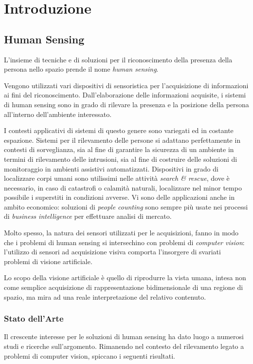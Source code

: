 
\chapter{Introduzione}
\label{chap:introduction}
    \section{Human Sensing}
    \label{sec:human_sensing}
        L'insieme di tecniche e di soluzioni per il riconoscimento della presenza della persona nello spazio prende il nome \emph{human sensing}.

        Vengono utilizzati vari dispositivi di sensoristica per l'acquisizione di informazioni ai fini del riconoscimento. 
        Dall'elaborazione delle informazioni acquisite, i sistemi di human sensing sono in grado di rilevare la presenza e la posizione della persona all'interno dell'ambiente interessato.

        I contesti applicativi di sistemi di questo genere sono variegati ed in costante espazione.
        Sistemi per il rilevamento delle persone si adattano perfettamente in contesti di sorveglianza, sia al fine di garantire la sicurezza di un ambiente in termini di rilevamento delle intrusioni, sia al fine di costruire delle soluzioni di monitoraggio in ambienti assistivi automatizzati.
        Dispositivi in grado di localizzare corpi umani sono utilissimi nelle attività \emph{search \& rescue}, dove è necessario, in caso di catastrofi o calamità naturali, localizzare nel minor tempo possibile i superstiti in condizioni avverse.
        Vi sono delle applicazioni anche in ambito economico: soluzioni di \emph{people counting} sono sempre più usate nei processi di \emph{business intelligence} per effettuare analisi di mercato.

        Molto spesso, la natura dei sensori utilizzati per le acquisizioni, fanno in modo che i problemi di human sensing si intersechino con problemi di \emph{computer vision}: l'utilizzo di sensori ad acquisizione visiva comporta l'insorgere di svariati problemi di visione artificiale.

        Lo scopo della visione artificiale è quello di riprodurre la vista umana, intesa non come semplice acquisizione di rappresentazione bidimensionale di una regione di spazio, ma mira ad una reale interpretazione del relativo contenuto.

        \subsection{Stato dell'Arte}
            Il crescente interesse per le soluzioni di human sensing ha dato luogo a numerosi studi e ricerche sull'argomento.
            Rimanendo nel contesto del rilevamento legato a problemi di computer vision, spiccano i seguenti risultati.

